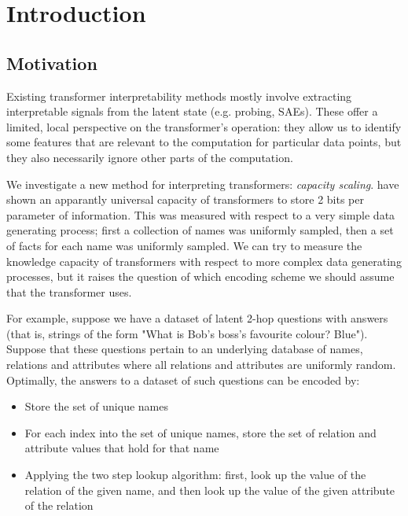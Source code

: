 \documentclass{article}
\theoremstyle{plain}
\theoremstyle{definition}
\theoremstyle{remark}
\begin{document}
\section{Introduction}
\label{introduction}


\subsection{Motivation}

Existing transformer interpretability methods mostly involve extracting interpretable signals from the latent state (e.g. probing, SAEs). These offer a limited, local perspective on the transformer's operation: they allow us to identify some features that are relevant to the computation for particular data points, but they also necessarily ignore other parts of the computation. 

We investigate a new method for interpreting transformers: \emph{capacity scaling}. \citet{allen-zhuPhysicsLanguageModels2024} have shown an apparantly universal capacity of transformers to store 2 bits per parameter of information. This was measured with respect to a very simple data generating process; first a collection of names was uniformly sampled, then a set of facts for each name was uniformly sampled. We can try to measure the knowledge capacity of transformers with respect to more complex data generating processes, but it raises the question of which encoding scheme we should assume that the transformer uses.

For example, suppose we have a dataset of latent 2-hop questions with answers (that is, strings of the form "What is Bob's boss's favourite colour? Blue"). Suppose that these questions pertain to an underlying database of names, relations and attributes where all relations and attributes are uniformly random. Optimally, the answers to a dataset of such questions can be encoded by:

\begin{itemize}
    \item Store the set of unique names
    \item For each index into the set of unique names, store the set of relation and attribute values that hold for that name
    \item Applying the two step lookup algorithm: first, look up the value of the relation of the given name, and then look up the value of the given attribute of the relation
\end{itemize}
\end{document}
